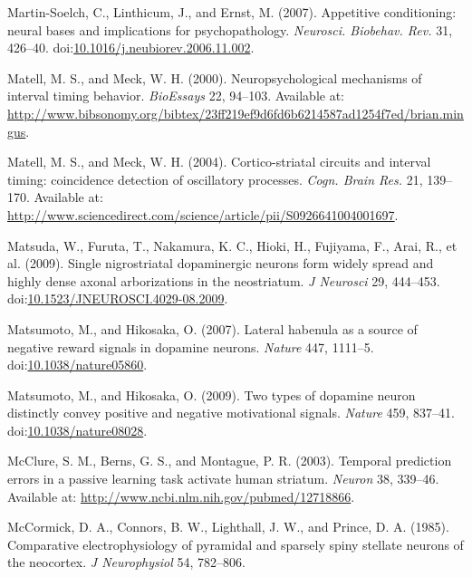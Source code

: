 \documentclass[
  11pt,
  a4paper,
]{scrbook}
\newlength{\cslhangindent}
\newenvironment{CSLReferences}[2] %
 {\begin{list}{}{%
  \setlength{\itemindent}{0pt}
  \setlength{\leftmargin}{0pt}
  \setlength{\parsep}{0pt}
  \ifodd #1
   \setlength{\leftmargin}{\cslhangindent}
   \setlength{\itemindent}{-1\cslhangindent}
  \fi
  \setlength{\itemsep}{#2\baselineskip}}}
 {\end{list}}
\begin{document}
\begin{CSLReferences}{1}{1}
Martin-Soelch, C., Linthicum, J., and Ernst, M. (2007). {Appetitive
conditioning: neural bases and implications for psychopathology.}
\emph{Neurosci. Biobehav. Rev.} 31, 426--40.
doi:\href{https://doi.org/10.1016/j.neubiorev.2006.11.002}{10.1016/j.neubiorev.2006.11.002}.

Matell, M. S., and Meck, W. H. (2000). {Neuropsychological mechanisms of
interval timing behavior}. \emph{BioEssays} 22, 94--103. Available at:
\url{http://www.bibsonomy.org/bibtex/23ff219ef9d6fd6b6214587ad1254f7ed/brian.mingus}.

Matell, M. S., and Meck, W. H. (2004). {Cortico-striatal circuits and
interval timing: coincidence detection of oscillatory processes}.
\emph{Cogn. Brain Res.} 21, 139--170. Available at:
\url{http://www.sciencedirect.com/science/article/pii/S0926641004001697}.

Matsuda, W., Furuta, T., Nakamura, K. C., Hioki, H., Fujiyama, F., Arai,
R., et al. (2009). Single nigrostriatal dopaminergic neurons form widely
spread and highly dense axonal arborizations in the neostriatum. \emph{J
Neurosci} 29, 444--453.
doi:\href{https://doi.org/10.1523/JNEUROSCI.4029-08.2009}{10.1523/JNEUROSCI.4029-08.2009}.

Matsumoto, M., and Hikosaka, O. (2007). {Lateral habenula as a source of
negative reward signals in dopamine neurons.} \emph{Nature} 447,
1111--5.
doi:\href{https://doi.org/10.1038/nature05860}{10.1038/nature05860}.

Matsumoto, M., and Hikosaka, O. (2009). {Two types of dopamine neuron
distinctly convey positive and negative motivational signals.}
\emph{Nature} 459, 837--41.
doi:\href{https://doi.org/10.1038/nature08028}{10.1038/nature08028}.

McClure, S. M., Berns, G. S., and Montague, P. R. (2003). {Temporal
prediction errors in a passive learning task activate human striatum.}
\emph{Neuron} 38, 339--46. Available at:
\url{http://www.ncbi.nlm.nih.gov/pubmed/12718866}.

McCormick, D. A., Connors, B. W., Lighthall, J. W., and Prince, D. A.
(1985). Comparative electrophysiology of pyramidal and sparsely spiny
stellate neurons of the neocortex. \emph{J Neurophysiol} 54, 782--806.


\end{CSLReferences}
\end{document}
